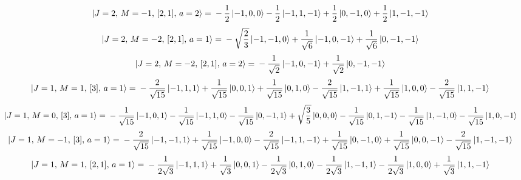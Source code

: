 \documentclass{article}
\begin{document}
\begin{equation*}
\begin{aligned}
\ket{J=2,\,M=-1,\,[2,1],\,a=2} = \; &- \frac{1}{2} \ket{-1,0,0} - \frac{1}{2} \ket{-1,1,-1} + \frac{1}{2} \ket{0,-1,0} + \frac{1}{2} \ket{1,-1,-1}
\end{aligned}
\end{equation*}
\begin{equation*}
\begin{aligned}
\ket{J=2,\,M=-2,\,[2,1],\,a=1} = \; &- \sqrt{\frac{2}{3}} \ket{-1,-1,0} + \frac{1}{\sqrt{6}} \ket{-1,0,-1} + \frac{1}{\sqrt{6}} \ket{0,-1,-1}
\end{aligned}
\end{equation*}
\begin{equation*}
\begin{aligned}
\ket{J=2,\,M=-2,\,[2,1],\,a=2} = \; &- \frac{1}{\sqrt{2}} \ket{-1,0,-1} + \frac{1}{\sqrt{2}} \ket{0,-1,-1}
\end{aligned}
\end{equation*}
\begin{equation*}
\begin{aligned}
\ket{J=1,\,M=1,\,[3],\,a=1} = \; &- \frac{2}{\sqrt{15}} \ket{-1,1,1} + \frac{1}{\sqrt{15}} \ket{0,0,1} + \frac{1}{\sqrt{15}} \ket{0,1,0} - \frac{2}{\sqrt{15}} \ket{1,-1,1} + \frac{1}{\sqrt{15}} \ket{1,0,0} - \frac{2}{\sqrt{15}} \ket{1,1,-1}
\end{aligned}
\end{equation*}
\begin{equation*}
\begin{aligned}
\ket{J=1,\,M=0,\,[3],\,a=1} = \; &- \frac{1}{\sqrt{15}} \ket{-1,0,1} - \frac{1}{\sqrt{15}} \ket{-1,1,0} - \frac{1}{\sqrt{15}} \ket{0,-1,1} + \sqrt{\frac{3}{5}} \ket{0,0,0} - \frac{1}{\sqrt{15}} \ket{0,1,-1} - \frac{1}{\sqrt{15}} \ket{1,-1,0} - \frac{1}{\sqrt{15}} \ket{1,0,-1}
\end{aligned}
\end{equation*}
\begin{equation*}
\begin{aligned}
\ket{J=1,\,M=-1,\,[3],\,a=1} = \; &- \frac{2}{\sqrt{15}} \ket{-1,-1,1} + \frac{1}{\sqrt{15}} \ket{-1,0,0} - \frac{2}{\sqrt{15}} \ket{-1,1,-1} + \frac{1}{\sqrt{15}} \ket{0,-1,0} + \frac{1}{\sqrt{15}} \ket{0,0,-1} - \frac{2}{\sqrt{15}} \ket{1,-1,-1}
\end{aligned}
\end{equation*}
\begin{equation*}
\begin{aligned}
\ket{J=1,\,M=1,\,[2,1],\,a=1} = \; &- \frac{1}{2\sqrt{3}} \ket{-1,1,1} + \frac{1}{\sqrt{3}} \ket{0,0,1} - \frac{1}{2\sqrt{3}} \ket{0,1,0} - \frac{1}{2\sqrt{3}} \ket{1,-1,1} - \frac{1}{2\sqrt{3}} \ket{1,0,0} + \frac{1}{\sqrt{3}} \ket{1,1,-1}
\end{aligned}
\end{equation*}
\end{document}
